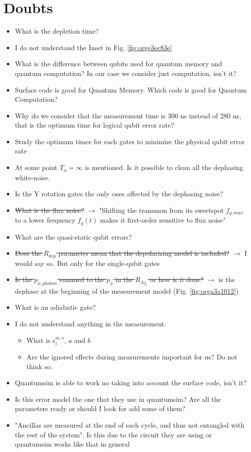 \documentclass[11pt]{article}
\begin{document}
\section{Doubts}
\label{sec:orge77b3b4}
\begin{itemize}
\item What is the depletion time?
\item I do not understand the Inset in Fig. \ref{fig:orge3ec83e}
\item What is the difference between qubits used for quantum memory and quantum computation? In our case we consider just computation, isn't it?
\item Surface code is good for Quantum Memory. Which code is good for Quantum Computation?
\item Why do we consider that the measurement time is 300 ns instead of 280 ns, that is the optimum time for logical qubit error rate?
\item Study the optimum times for each gates to minimize the physical qubit error rate
\item At some point \(T_{\phi} = \infty\) is mentioned. Is it possible to clean all the dephasing white-noise.
\item Is the Y rotation gates the only ones affected by the dephasing noise?
\item \sout{What is the flux noise?} \(\to\) "Shifting the transmon from its sweetspot \(f_{q,max}\) to a lower frequency \(f_q (t)\) makes it first-order sensitive to flux noise"
\item What are the quasi-static qubit errors?
\item \sout{Does the \(R_{dep}\) parameter mean that the depolarizing model is included?} \(\to\) I would say so. But only for the single-qubit gates
\item \sout{Is the \(p_{\phi, photon}\) summed to the \(p_{\phi}\) in the \(R_{\Lambda_{T_{\phi}}}\) or how is it done?} \(\to\) is the dephase at the beginning of the measurement model (Fig. \ref{fig:orga3a1012})
\item What is an adiabatic gate?
\item I do not understand anything in the measurement.
\begin{itemize}
\item What is \(\epsilon_i^{m,o}\), \(a\) and \(b\)
\item Are the ignored effects during measurements important for us? Do not think so.
\end{itemize}
\item Quantumsim is able to work no taking into account the surface code, isn't it?
\item Is this error model the one that they use in quantumsim? Are all the parameters ready or should I look for add some of them?
\item "Ancillas are measured at the end of each cycle, and thus not entangled with the rest of the system". Is this due to the circuit they are using or quantumsim works like that in general
\end{itemize}
\end{document}
